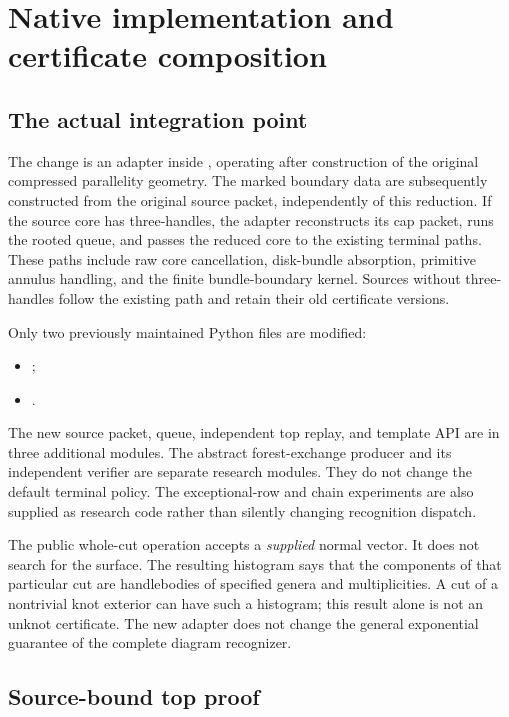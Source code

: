 \section{Native implementation and certificate composition}
\label{sec:implementation}

\subsection{The actual integration point}

The change is an adapter inside , operating
after construction of the original compressed parallelity geometry. The
marked boundary data are subsequently constructed from the original source
packet, independently of this reduction. If the source core has three-handles, the adapter
reconstructs its cap packet, runs the rooted queue, and passes the reduced
core to the existing terminal paths. These paths include raw core
cancellation, disk-bundle absorption, primitive annulus handling, and the
finite bundle-boundary kernel. Sources without three-handles follow the
existing path and retain their old certificate versions.

Only two previously maintained Python files are modified:
\begin{itemize}
\item {};
\item {}.
\end{itemize}
The new source packet, queue, independent top replay, and template API are
in three additional modules. The abstract forest-exchange producer and its
independent verifier are separate research modules. They do not change the
default terminal policy. The exceptional-row and chain experiments are
also supplied as research code rather than silently changing recognition
dispatch.

The public whole-cut operation accepts a \emph{supplied} normal vector.
It does not search for the surface. The resulting histogram says that the
components of that particular cut are handlebodies of specified genera and
multiplicities. A cut of a nontrivial knot exterior can have such a
histogram; this result alone is not an unknot certificate. The new adapter
does not change the general exponential guarantee of the complete diagram
recognizer.

\subsection{Source-bound top proof}

